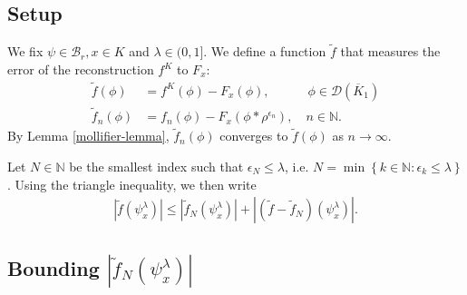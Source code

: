 \subsection*{Setup} 

We fix $\psi \in \mathcal{B}_r, x \in K$ and $\lambda \in (0,1]$. We define a function $\tilde f$ that measures the error of the reconstruction $f^K$ to $F_x$:  
\begin{align*}
    \tilde f(\phi) &= f^K(\phi) - F_x(\phi), \quad \qquad \phi \in \mathcal{D}(\overline{K}_1)\\
    \tilde f_n(\phi) &= f_n(\phi) - F_x(\phi * \rho^{\epsilon_n}), \quad n \in \mathbb{N}.
\end{align*}
By Lemma \ref{mollifier-lemma}, $\tilde f_n(\phi)$ converges to $\tilde f(\phi)$ as $n \to \infty$.

Let $N \in \mathbb{N}$ be the smallest index such that $\epsilon_N \leq \lambda$, i.e. $N = \min \left\{ k \in \mathbb{N} : \epsilon_k \leq \lambda  \right\}$. Using the triangle inequality, we then write 
\begin{align*}
    |\tilde f (\psi^\lambda_x)| \leq  |\tilde f_N (\psi^\lambda_x)| + |(\tilde f - \tilde f_N) (\psi^\lambda_x)|.
\end{align*}

\subsection*{Bounding $|\tilde f_N (\psi^\lambda_x)|$} 

